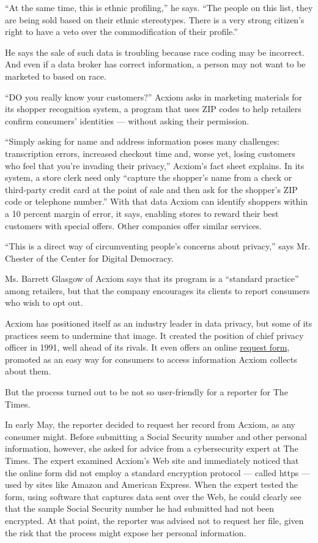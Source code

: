 ``At the same time, this is ethnic profiling,'' he says. ``The people on
this list, they are being sold based on their ethnic stereotypes. There
is a very strong citizen's right to have a veto over the commodification
of their profile.''

He says the sale of such data is troubling because race coding may be
incorrect. And even if a data broker has correct information, a person
may not want to be marketed to based on race.

``DO you really know your customers?'' Acxiom asks in marketing
materials for its shopper recognition system, a program that uses ZIP
codes to help retailers confirm consumers' identities --- without asking
their permission.

``Simply asking for name and address information poses many challenges:
transcription errors, increased checkout time and, worse yet, losing
customers who feel that you're invading their privacy,'' Acxiom's fact
sheet explains. In its system, a store clerk need only ``capture the
shopper's name from a check or third-party credit card at the point of
sale and then ask for the shopper's ZIP code or telephone number.'' With
that data Acxiom can identify shoppers within a 10 percent margin of
error, it says, enabling stores to reward their best customers with
special offers. Other companies offer similar services.

``This is a direct way of circumventing people's concerns about
privacy,'' says Mr. Chester of the Center for Digital Democracy.

Ms. Barrett Glasgow of Acxiom says that its program is a ``standard
practice'' among retailers, but that the company encourages its clients
to report consumers who wish to opt out.

Acxiom has positioned itself as an industry leader in data privacy, but
some of its practices seem to undermine that image. It created the
position of chief privacy officer in 1991, well ahead of its rivals. It
even offers an online
\href{http://www.acxiom.com/about-acxiom/privacy/us-consumer-choices/}{request
form}, promoted as an easy way for consumers to access information
Acxiom collects about them.

But the process turned out to be not so user-friendly for a reporter for
The Times.

In early May, the reporter decided to request her record from Acxiom, as
any consumer might. Before submitting a Social Security number and other
personal information, however, she asked for advice from a cybersecurity
expert at The Times. The expert examined Acxiom's Web site and
immediately noticed that the online form did not employ a standard
encryption protocol --- called https --- used by sites like Amazon and
American Express. When the expert tested the form, using software that
captures data sent over the Web, he could clearly see that the sample
Social Security number he had submitted had not been encrypted. At that
point, the reporter was advised not to request her file, given the risk
that the process might expose her personal information.

